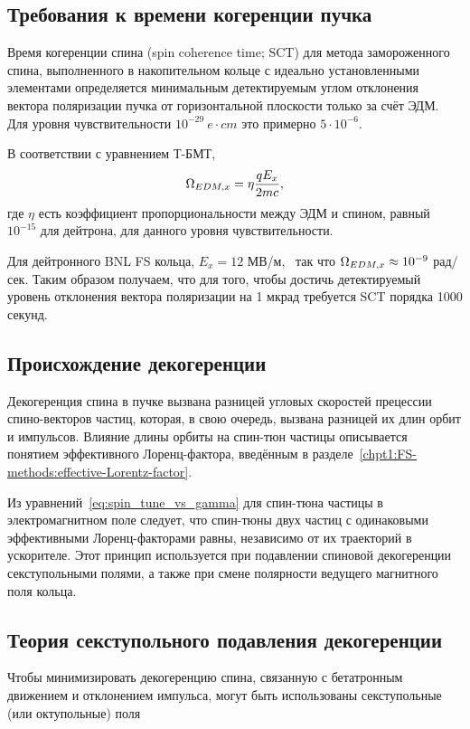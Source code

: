 
\newcommand{\Tlmsq}{Тл/м$^2$}

\subsection{Требования к времени когеренции пучка}
Время когеренции спина (spin coherence time; SCT) для метода
замороженного спина, выполненного в накопительном кольце с идеально
установленными элементами определяется минимальным детектируемым углом
отклонения вектора поляризации пучка от горизонтальной плоскости
только за счёт ЭДМ. Для уровня чувствительности $10^{-29}~e\cdot cm$
это примерно $5\cdot10^{-6}$.~\cite{BNL:Deuteron2008}

В соответствии с уравнением Т-БМТ,
\[
\Omega_{EDM,x} = \eta\frac{qE_x}{2mc},
\]
где $\eta$ есть коэффициент пропорциональности между ЭДМ и спином,
равный $10^{-15}$ для дейтрона, для данного уровня чувствительности.~\cite[стр.~206]{Eremey:Thesis}

Для дейтронного BNL FS кольца, $E_x = 12$
МВ/м,~\cite[стр.~19]{BNL:Deuteron2008} так что $\Omega_{EDM,x}\approx
10^{-9}$ рад/сек. Таким образом получаем, что для того, чтобы достичь
детектируемый уровень отклонения вектора поляризации на 1 мкрад требуется SCT порядка 1000 секунд.~\cite[стр.~207]{Eremey:Thesis}
\subsection{Происхождение декогеренции}\label{sec:decoh:origin}
Декогеренция спина в пучке вызвана разницей угловых скоростей
прецессии спино-векторов частиц, которая, в свою очередь, вызвана разницей
их длин орбит и импульсов. Влияние длины орбиты на спин-тюн частицы описывается 
понятием эффективного Лоренц-фактора, введённым в разделе~\ref{chpt1:FS-methods:effective-Lorentz-factor}.

Из уравнений~\eqref{eq:spin_tune_vs_gamma} для спин-тюна частицы в электромагнитном поле следует, 
что спин-тюны двух частиц с одинаковыми эффективными Лоренц-факторами равны, независимо от их траекторий в ускорителе. Этот принцип используется при подавлении спиновой декогеренции секступольными полями, а также при смене полярности ведущего магнитного поля кольца.

\subsection{Теория секступольного подавления декогеренции}\label{sec:sextupole_spin_dec_solution}
Чтобы минимизировать декогеренцию спина, связанную с бетатронным
движением и отклонением импульса, могут быть использованы
секступольные (или октупольные) поля~\cite[стр.~212]{Eremey:Thesis}

